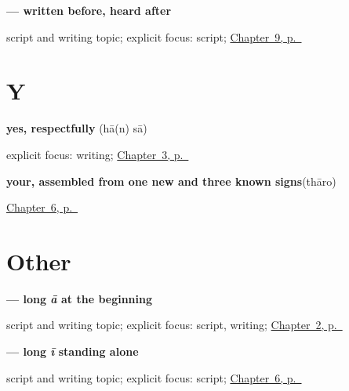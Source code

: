 \noindent\begin{minipage}[t]{\linewidth}
\raggedright
\textbf{ — written before, heard after}\par
\footnotesize script and writing topic; explicit focus: script; \hyperref[ch:mw-see-you-later]{Chapter~9, p.~\pageref*{ch:mw-see-you-later}}
\end{minipage}\par\smallskip

\section*{Y}

\noindent\begin{minipage}[t]{\linewidth}
\raggedright
\textbf{yes, respectfully}\enspace\emph{ }\enspace(hā(n) sā)\par
\footnotesize explicit focus: writing; \hyperref[ch:mw-haan-saa]{Chapter~3, p.~\pageref*{ch:mw-haan-saa}}
\end{minipage}\par\smallskip

\noindent\begin{minipage}[t]{\linewidth}
\raggedright
\textbf{your, assembled from one new and three known signs}\enspace\emph{}\enspace(thāro)\par
\footnotesize \hyperref[ch:mw-name-question]{Chapter~6, p.~\pageref*{ch:mw-name-question}}
\end{minipage}\par\smallskip

\section*{Other}

\noindent\begin{minipage}[t]{\linewidth}
\raggedright
\textbf{ — long \emph{ā} at the beginning}\par
\footnotesize script and writing topic; explicit focus: script, writing; \hyperref[ch:mw-aabhaar]{Chapter~2, p.~\pageref*{ch:mw-aabhaar}}
\end{minipage}\par\smallskip

\noindent\begin{minipage}[t]{\linewidth}
\raggedright
\textbf{ — long \emph{ī} standing alone}\par
\footnotesize script and writing topic; explicit focus: script; \hyperref[ch:mw-name-question]{Chapter~6, p.~\pageref*{ch:mw-name-question}}
\end{minipage}\par\smallskip

